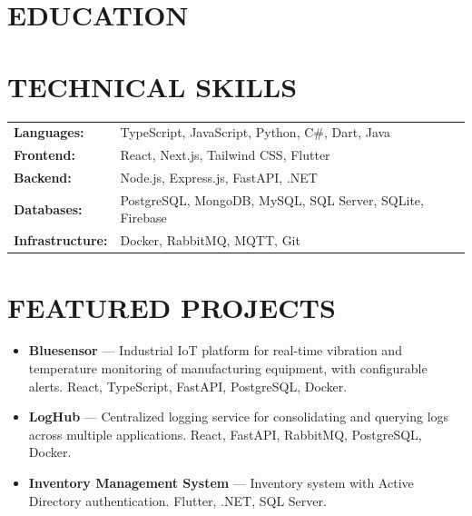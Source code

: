 \section*{EDUCATION}



\section*{TECHNICAL SKILLS}
\begin{tabularx}{\linewidth}{@{}lX@{}}
\textbf{\color{navy}Languages:} & TypeScript, JavaScript, Python, C\#, Dart, Java \\[3pt]
\textbf{\color{navy}Frontend:} & React, Next.js, Tailwind CSS, Flutter \\[3pt]
\textbf{\color{navy}Backend:} & Node.js, Express.js, FastAPI, .NET \\[3pt]
\textbf{\color{navy}Databases:} & PostgreSQL, MongoDB, MySQL, SQL Server, SQLite, Firebase \\[3pt]
\textbf{\color{navy}Infrastructure:} & Docker, RabbitMQ, MQTT, Git \\
\end{tabularx}

\section*{FEATURED PROJECTS}
\begin{itemize}[leftmargin=14pt, itemsep=4pt, topsep=2pt]
  \item \textbf{Bluesensor} --- Industrial IoT platform for real-time vibration and temperature monitoring of manufacturing equipment, with configurable alerts. React, TypeScript, FastAPI, PostgreSQL, Docker.
  \item \textbf{LogHub} --- Centralized logging service for consolidating and querying logs across multiple applications. React, FastAPI, RabbitMQ, PostgreSQL, Docker.
  \item \textbf{Inventory Management System} --- Inventory system with Active Directory authentication. Flutter, .NET, SQL Server.
\end{itemize}

